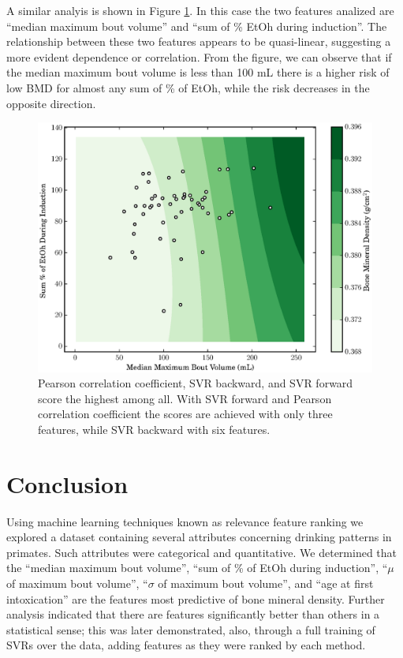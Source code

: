 \documentclass{bmcart}
\begin{document}
A similar analyis is shown in Figure \ref{fig:maxb_sum}. In this case the
two features analized are ``median maximum bout volume'' and ``sum of \% EtOh
during induction''. The relationship between these two features appears to be
quasi-linear, suggesting a more evident dependence or correlation. From the
figure, we can observe that if the median maximum bout volume is less than 100
mL there is a higher risk of low BMD for almost any sum of \% of EtOh, while
the risk decreases in the opposite direction.

\begin{figure}[t]
    \caption{
Pearson correlation coefficient, SVR backward, and SVR forward score the
highest among all. With SVR forward and Pearson correlation coefficient the scores
are achieved with only three features, while SVR backward with six features.}
\label{fig:maxb_sum}
    \includegraphics[width=\textwidth]{mmbv_soedi.eps}
\end{figure}

\section*{Conclusion}
Using machine learning techniques known as relevance feature ranking we
explored a dataset containing several attributes concerning drinking
patterns in primates. Such attributes were categorical and quantitative. We
determined that the ``median maximum bout volume'', ``sum of \% of EtOh during
induction'', ``$\mu$ of maximum bout volume'', ``$\sigma$ of maximum bout
volume'', and ``age at first intoxication'' are the features most predictive  
of bone mineral density.
Further analysis indicated that there are features significantly better than
others in a statistical sense; this was later demonstrated, also, through a full
training of SVRs over the data, adding features as they were ranked by each
method.
\end{document}
